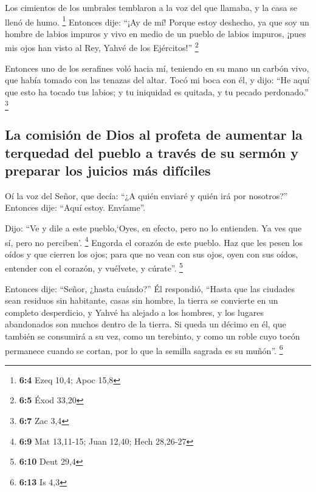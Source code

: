 \begin{paracol}{2}
 Los cimientos de los umbrales temblaron a la voz del que
llamaba, y la casa se llenó de humo. \footnote{\textbf{6:4} Ezeq 10,4;
  Apoc 15,8}  Entonces dije: ``¡Ay de mí! Porque estoy
deshecho, ya que soy un hombre de labios impuros y vivo en medio de un
pueblo de labios impuros, ¡pues mis ojos han visto al Rey, Yahvé de los
Ejércitos!'' \footnote{\textbf{6:5} Éxod 33,20}

 Entonces uno de los serafines voló hacia mí, teniendo en
su mano un carbón vivo, que había tomado con las tenazas del altar.
 Tocó mi boca con él, y dijo: ``He aquí que esto ha tocado
tus labios; y tu iniquidad es quitada, y tu pecado perdonado.''
\footnote{\textbf{6:7} Zac 3,4}

\hypertarget{la-comisiuxf3n-de-dios-al-profeta-de-aumentar-la-terquedad-del-pueblo-a-travuxe9s-de-su-sermuxf3n-y-preparar-los-juicios-muxe1s-difuxedciles}{%
\subsection{La comisión de Dios al profeta de aumentar la terquedad del
pueblo a través de su sermón y preparar los juicios más
difíciles}\label{la-comisiuxf3n-de-dios-al-profeta-de-aumentar-la-terquedad-del-pueblo-a-travuxe9s-de-su-sermuxf3n-y-preparar-los-juicios-muxe1s-difuxedciles}}

 Oí la voz del Señor, que decía: ``¿A quién enviaré y
quién irá por nosotros?'' Entonces dije: ``Aquí estoy. Envíame''.

 Dijo: ``Ve y dile a este pueblo,`Oyes, en efecto, pero no
lo entienden. Ya ves que sí, pero no perciben'. \footnote{\textbf{6:9}
  Mat 13,11-15; Juan 12,40; Hech 28,26-27}  Engorda el
corazón de este pueblo. Haz que les pesen los oídos y que cierren los
ojos; para que no vean con sus ojos, oyen con sus oídos, entender con el
corazón, y vuélvete, y cúrate''. \footnote{\textbf{6:10} Deut 29,4}

 Entonces dije: ``Señor, ¿hasta cuándo?'' Él respondió,
``Hasta que las ciudades sean residuos sin habitante, casas sin hombre,
la tierra se convierte en un completo desperdicio,  y
Yahvé ha alejado a los hombres, y los lugares abandonados son muchos
dentro de la tierra.  Si queda un décimo en él, que
también se consumirá a su vez, como un terebinto, y como un roble cuyo
tocón permanece cuando se cortan, por lo que la semilla sagrada es su
muñón''. \footnote{\textbf{6:13} Is 4,3}


\end{paracol}
